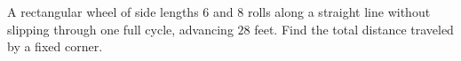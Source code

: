 A rectangular wheel of side lengths $6$ and $8$ rolls along a straight line without slipping through one full cycle, advancing $28$ feet. Find the total distance traveled by a fixed corner.
